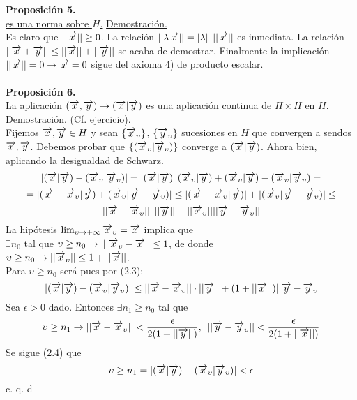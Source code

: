 \textbf{Proposición 5.} \\
\underline{  es una norma sobre $H$.}
\underline{Demostración.}\\
Es claro que $ || \overrightarrow{x} || \geq 0$. La relación $|| \lambda \overrightarrow{x} ||=|\lambda| \phantom{s} ||\overrightarrow{x} ||$ es inmediata. La relación $|| \overrightarrow{x} + \overrightarrow{y} || \leq || \overrightarrow{x} || + ||\overrightarrow{y}||$ se acaba de demostrar. Finalmente la implicación $||\overrightarrow{x} || =0 \rightarrow \overrightarrow{x}=0$ sigue del axioma 4) de producto escalar. \\
 \\
 \textbf{Proposición 6.}\\
 La aplicación $(\overrightarrow{x}, \overrightarrow{y}) \rightarrow (\overrightarrow{x} | \overrightarrow{y})$ es una aplicación continua de $H \times H$ en $H$.  \\
 \underline{Demostración.} (Cf. ejercicio). \\
 Fijemos $\overrightarrow{x}, \overrightarrow{y} \in H$ y sean $\lbrace \overrightarrow{x}_\upsilon \rbrace$, $\lbrace \overrightarrow{y}_\upsilon \rbrace$ sucesiones en $H$ que convergen a sendos $\overrightarrow{x}, \overrightarrow{y}$. Debemos probar que $\lbrace (\overrightarrow{x}_\upsilon | \overrightarrow{y}_\upsilon)  \rbrace$ converge a $(\overrightarrow{x} | \overrightarrow{y} )$. Ahora bien, aplicando la desigualdad de Schwarz. 
\begin{equation}
|(\overrightarrow{x} | \overrightarrow{y})-( \overrightarrow{x}_\upsilon | \overrightarrow{y}_\upsilon)| =| (\overrightarrow{x} | \overrightarrow{y}) \phantom{s} (\overrightarrow{x}_\upsilon | \overrightarrow{y}) + (\overrightarrow{x}_\upsilon| \overrightarrow{y})- (\overrightarrow{x}_\upsilon | \overrightarrow{y}_\upsilon)=
\end{equation}
\begin{equation*}
=|(\overrightarrow{x}-\overrightarrow{x}_\upsilon| \overrightarrow{y}) +(\overrightarrow{x}_\upsilon |\overrightarrow{y} - \overrightarrow{y}_\upsilon)| \leq |(\overrightarrow{x}-\overrightarrow{x}_\upsilon| \overrightarrow{y})| + |(\overrightarrow{x}_\upsilon|\overrightarrow{y}-\overrightarrow{y}_\upsilon )| \leq 
\end{equation*}
\begin{equation*}
||\overrightarrow{x} - \overrightarrow{x}_\upsilon || \phantom{s} || \overrightarrow{y} || + || \overrightarrow{x}_\upsilon || || \overrightarrow{y}-\overrightarrow{y}_\upsilon ||
\end{equation*}
La hipótesis $\lim_{\upsilon \to +\infty}\overrightarrow{x}_\upsilon=\overrightarrow{x}$ implica que\\
$\exists n_0$ tal que $ \upsilon \geq n_0 \rightarrow$ $|| \overrightarrow{x}_\upsilon-\overrightarrow{x} || \leq 1$, de donde \\
$\upsilon \geq n_0 \rightarrow || \overrightarrow{x}_\upsilon || \leq 1+ || \overrightarrow{x} || $. \\
Para $\upsilon \geq n_0$ será pues por (2.3): \\
\begin{equation}
| (\overrightarrow{x} | \overrightarrow{y}) - (\overrightarrow{x}_\upsilon | \overrightarrow{y}_\upsilon)| \leq || \overrightarrow{x} - \overrightarrow{x}_\upsilon || \cdot || \overrightarrow{y} || + (1+|| \overrightarrow{x} ||)|| \overrightarrow{y} -\overrightarrow{y}_\upsilon
\end{equation}
Sea $\epsilon >0$ dado. Entonces $\exists n_1 \geq n_0$ tal que
$$
\upsilon \geq n_1 \rightarrow || \overrightarrow{x} - \overrightarrow{x}_\upsilon || < \frac{\epsilon}{2(1+|| \overrightarrow{y} ||)}, \phantom{s} || \overrightarrow{y} -\overrightarrow{y}_\upsilon || < \frac{\epsilon}{2(1+||\overrightarrow{x}||)}
$$
Se sigue (2.4) que 
$$
\upsilon \geq n_1=| (\overrightarrow{x} | \overrightarrow{y})-(\overrightarrow{x}_\upsilon |\overrightarrow{y}_\upsilon)| < \epsilon
$$
\phantom{sssssssssssssssssssssssssssssssssss sasdasdasdasdadadssada} c. q. d

